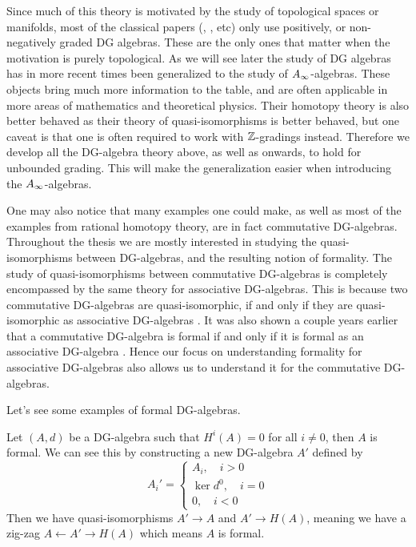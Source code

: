 Since much of this theory is motivated by the study of topological spaces or manifolds, most of the classical papers (\cite{DGMS}, \cite{Sullivan}, \cite{PLdeRham} etc) only use positively, or non-negatively graded DG algebras. These are the only ones that matter when the motivation is purely topological. As we will see later the study of DG algebras has in more recent times been generalized to the study of $A_{\infty}$-algebras. These objects bring much more information to the table, and are often applicable in more areas of mathematics and theoretical physics. Their homotopy theory is also better behaved as their theory of quasi-isomorphisms is better behaved, but one caveat is that one is often required to work with $\mathbb{Z}$-gradings instead. Therefore we develop all the DG-algebra theory above, as well as onwards, to hold for unbounded grading. This will make the generalization easier when introducing the $A_{\infty}$-algebras. 

One may also notice that many examples one could make, as well as most of the examples from rational homotopy theory, are in fact commutative DG-algebras. Throughout the thesis we are mostly interested in studying the quasi-isomorphisms between DG-algebras, and the resulting notion of formality. The study of quasi-isomorphisms between commutative DG-algebras is completely encompassed by the same theory for associative DG-algebras. This is because two commutative DG-algebras are quasi-isomorphic, if and only if they are quasi-isomorphic as associative DG-algebras \cite{Petersen}. It was also shown a couple years earlier that a commutative DG-algebra is formal if and only if it is formal as an associative DG-algebra \cite{Saleh}. Hence our focus on understanding formality for associative DG-algebras also allows us to understand it for the commutative DG-algebras. 


Let's see some examples of formal DG-algebras. 

\begin{example}
Let $(A, d)$ be a DG-algebra such that $H^i(A) = 0$ for all $i\neq 0$, then $A$ is formal. We can see this by constructing a new DG-algebra $A'$ defined by
\begin{equation*}
A_i'=
\begin{cases}
    A_i, \quad i > 0 \\
    \ker d^0, \quad i=0 \\
    0, \quad i < 0
\end{cases}    
\end{equation*}
Then we have quasi-isomorphisms $A'\longrightarrow A$ and $A'\longrightarrow H(A)$, meaning we have a zig-zag $A\longleftarrow A' \longrightarrow H(A)$ which means $A$ is formal. 
\end{example}

